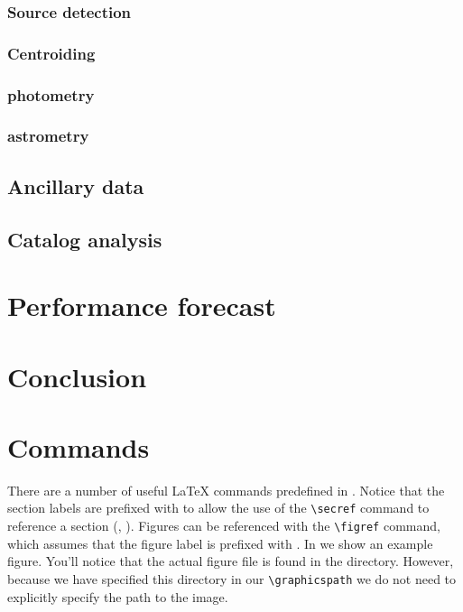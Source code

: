 \documentclass[\docopts]{\docclass}
\begin{document}
\subsubsection{Source detection}
\label{sec:detection}

\subsubsection{Centroiding}
\label{sec:centroiding}

\subsubsection{photometry}
\label{sec:photometry}

\subsubsection{astrometry}
\label{sec:astrometry}

\subsection{Ancillary data}
\label{sec:ancillary}


\subsection{Catalog analysis}
\label{sec:analysis}


\section{Performance forecast}
\label{sec:forecast}


\section{Conclusion}
\label{sec:conclusion}


\section{Commands}
\label{sec:commands}

There are a number of useful \LaTeX\xspace commands predefined in .
Notice that the section labels are prefixed with  to allow the use of the \verb=\secref= command to reference a section (\ie, ).
Figures can be referenced with the \verb=\figref= command, which assumes that the figure label is prefixed with .
In  we show an example figure.
You'll notice that the actual figure file is found in the  directory.
However, because we have specified this directory in our \verb=\graphicspath= we do not need to explicitly specify the path to the image.
\end{document}

